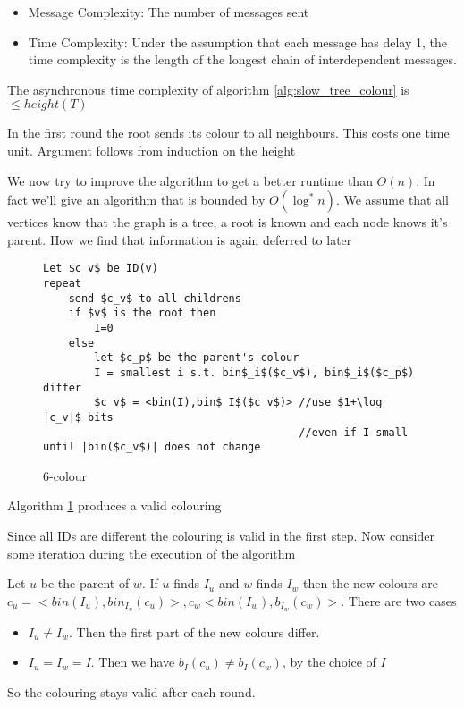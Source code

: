 \begin{itemize}
\item Message Complexity: The number of messages sent
\item Time Complexity: Under the assumption that each message has delay 1, the time complexity is the length of the longest chain of interdependent messages.
\end{itemize}

\begin{thm} The asynchronous time complexity of algorithm \ref{alg:slow_tree_colour} is $\leq height(T)$ \end{thm}
\begin{pr} In the first round the root sends its colour to all neighbours. This costs one time unit. Argument follows from induction on the height\end{pr}

We now try to improve the algorithm to get a better runtime than $O(n)$. In fact we'll give an algorithm that is bounded by $O(\log^*n)$. We assume that all vertices know that the graph is a tree, a root is known and each node knows it's parent. How we find that information is again deferred to later

\begin{figure}[hbt]
\begin{lstlisting}
Let $c_v$ be ID(v)
repeat 
	send $c_v$ to all childrens
	if $v$ is the root then
		I=0
	else 
		let $c_p$ be the parent's colour
		I = smallest i s.t. bin$_i$($c_v$), bin$_i$($c_p$) differ
		$c_v$ = <bin(I),bin$_I$($c_v$)> //use $1+\log |c_v|$ bits  
		                                //even if I small
until |bin($c_v$)| does not change
\end{lstlisting}
\caption{6-colour}
\label{alg:6-colour}
\end{figure}

\begin{lem} Algorithm \ref{alg:6-colour} produces a valid colouring \end{lem}

\begin{pr} Since all IDs are different the colouring is valid in the first step. Now consider some iteration during the execution of the algorithm

Let $u$ be the parent of $w$. If $u$ finds $I_u$ and $w$ finds $I_w$ then the new colours are $c_u=<bin(I_u), bin_{I_u}(c_u)>, c_w<bin(I_w),b_{I_w}(c_w)>$. There are two cases

\begin{itemize}
\item $I_u\neq I_w$. Then the first part of the new colours differ. \ok
\item $I_u=I_w=I$. Then we have $b_I(c_u)\neq b_I(c_w)$, by the choice of $I$ \ok
\end{itemize}

So the colouring stays valid after each round.
\end{pr}

